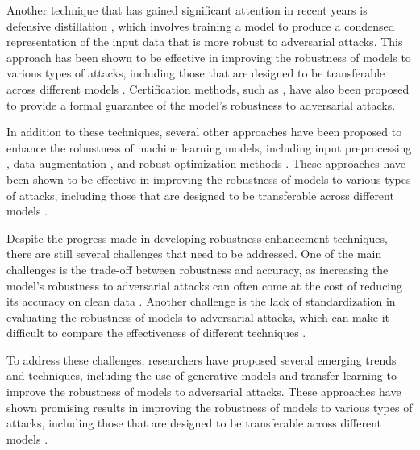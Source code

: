 \documentclass[11pt,a4paper]{article}
\begin{document}
Another technique that has gained significant attention in recent years is defensive distillation \cite{arxiv:1805.06605}, which involves training a model to produce a condensed representation of the input data that is more robust to adversarial attacks. This approach has been shown to be effective in improving the robustness of models to various types of attacks, including those that are designed to be transferable across different models \cite{doi:10.1609/aaai.v32i1.11828}. Certification methods, such as \cite{arxiv:1902.06705}, have also been proposed to provide a formal guarantee of the model's robustness to adversarial attacks.

In addition to these techniques, several other approaches have been proposed to enhance the robustness of machine learning models, including input preprocessing \cite{arxiv:1711.00117}, data augmentation \cite{doi:10.1109/cvpr.2019.00284}, and robust optimization methods \cite{arxiv:1911.05268}. These approaches have been shown to be effective in improving the robustness of models to various types of attacks, including those that are designed to be transferable across different models \cite{doi:10.1016/j.eng.2019.12.012}.

Despite the progress made in developing robustness enhancement techniques, there are still several challenges that need to be addressed. One of the main challenges is the trade-off between robustness and accuracy, as increasing the model's robustness to adversarial attacks can often come at the cost of reducing its accuracy on clean data \cite{doi:10.1109/cvpr42600.2020.00090}. Another challenge is the lack of standardization in evaluating the robustness of models to adversarial attacks, which can make it difficult to compare the effectiveness of different techniques \cite{doi:10.3390/bdcc8010008}.

To address these challenges, researchers have proposed several emerging trends and techniques, including the use of generative models \cite{arxiv:2001.05574} and transfer learning \cite{doi:10.1109/access.2022.3216291} to improve the robustness of models to adversarial attacks. These approaches have shown promising results in improving the robustness of models to various types of attacks, including those that are designed to be transferable across different models \cite{doi:10.1109/eurosp53844.2022.00047}.
\end{document}
